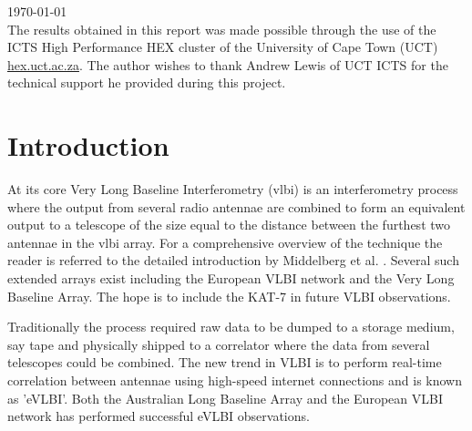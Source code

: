 \documentclass[a4paper,10pt]{article}
\begin{document}
\begin{titlepage}

{\large \today}\\[3cm] %
{The results obtained in this report was made possible through the use of the ICTS High Performance HEX cluster 
of the University of Cape Town (UCT) \url{hex.uct.ac.za}. The author wishes to thank Andrew Lewis of UCT ICTS for 
the technical support he provided during this project.}

 

\vfill %

\end{titlepage}

\printglossary[style=long]
\pagebreak
\tableofcontents
\pagebreak
\section{Introduction}
At its core Very Long Baseline Interferometry (\gls{vlbi}) is an interferometry process where the output from several radio antennae are 
combined to form an equivalent output to a telescope of the size equal to the distance between the furthest two antennae in the \gls{vlbi} array.
For a comprehensive overview of the technique the reader is referred to the detailed introduction by Middelberg et al. \cite{middelberg2008high}. Several
such extended arrays exist including the European VLBI network and the Very Long Baseline Array. The hope is to include the KAT-7 in future VLBI
observations.

Traditionally the process required raw data to be dumped to a storage medium, say tape and physically shipped to a correlator where the data from several 
telescopes could be combined. The new trend in VLBI is to perform real-time correlation between antennae using high-speed internet connections and is known
as 'eVLBI'. Both the Australian Long Baseline Array and the European VLBI network has performed successful eVLBI observations.
\end{document}

